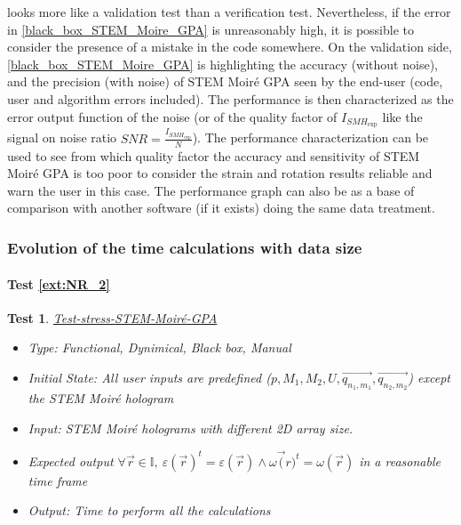 \documentclass[12pt, titlepage]{article}
\newcommand{\progname}{STEM Moir{\'e} GPA}
\newtheorem{Test}{Test}
\begin{document}
 looks more like a validation test than a verification test. Nevertheless, if the error in \cref{black_box_STEM_Moire_GPA} is unreasonably high, it is possible to consider the presence of a mistake in the code somewhere. On the validation side, \cref{black_box_STEM_Moire_GPA} is highlighting the accuracy (without noise), and the precision (with noise) of \progname{} seen by the end-user (code, user and algorithm errors included). The performance is then characterized as the error output function of the noise (or of the quality factor of $I_{\mathit{SMH}_{\text{exp}}}$ like the signal on noise ratio $\mathit{SNR}=\frac{I_{\mathit{SMH}_\text{exp}}}{N}$). The performance characterization can be used to see from which quality factor the accuracy and sensitivity of \progname{} is too poor to consider the strain and rotation results reliable and warn the user in this case. The performance graph can also be as a base of comparison with another software (if it exists) doing the same data treatment.

\subsubsection{Evolution of the time calculations with data size}
		
\paragraph{Test \cref{ext:NR_2}}

\begin{Test}\normalfont\underline{Test-stress-STEM-Moir{\'e}-GPA}
\label{stress_test_STEM_Moire_GPA}
\begin{itemize}
\item Type: Functional, Dynimical, Black box, Manual
\item Initial State: All user inputs are predefined ($p,M_1,M_2,U,\overrightarrow{q_{n_1,m_1}},\overrightarrow{q_{n_2,m_2}}$) except the STEM Moir{\'e} hologram
\item Input: STEM Moir{\'e} holograms with different 2D array size.
\item Expected output $\forall \vec{r} \in \mathbb{I}, \ \varepsilon(\vec{r})^{t}=\varepsilon(\vec{r}) \wedge \omega\vec({r})^{t}=\omega(\vec{r})$ in a reasonable time frame
\item Output: Time to perform all the calculations
\end{itemize}
\end{Test}
\end{document}
